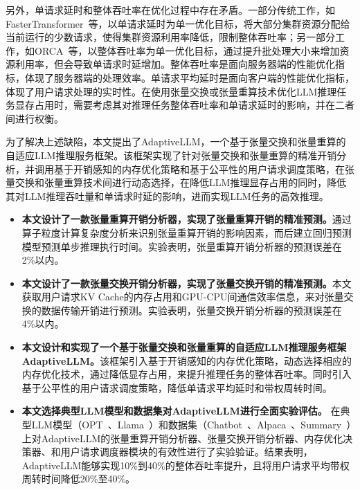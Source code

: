 {\color{red}另外，单请求延时和整体吞吐率在优化过程中存在矛盾。一部分传统工作，如FasterTransformer~\cite{FasterTransformer}等，以单请求延时为单一优化目标，将大部分集群资源分配给当前运行的少数请求，使得集群资源利用率降低，限制整体吞吐率；另一部分工作，如ORCA~\cite{vLLM, ORCA}等，以整体吞吐率为单一优化目标，通过提升批处理大小来增加资源利用率，但会导致单请求时延增加。}整体吞吐率是面向服务器端的性能优化指标，体现了服务器端的处理效率。单请求平均延时是面向客户端的性能优化指标，体现了用户请求处理的实时性。在使用张量交换或张量重算技术优化LLM推理任务显存占用时，需要考虑其对推理任务整体吞吐率和单请求延时的影响，并在二者间进行权衡。

为了解决上述缺陷，本文提出了AdaptiveLLM，一个基于张量交换和张量重算的自适应LLM推理服务框架。该框架实现了针对张量交换和张量重算的精准开销分析，并调用基于开销感知的内存优化策略和基于公平性的用户请求调度策略，在张量交换和张量重算技术间进行动态选择，在降低LLM推理显存占用的同时，降低其对LLM推理吞吐量和单请求时延的影响，进而实现LLM任务的高效推理。

\begin{itemize}

    \item \textbf{本文设计了一款张量重算开销分析器，实现了张量重算开销的精准预测。}通过算子粒度计算复杂度分析来识别张量重算开销的影响因素，而后建立回归预测模型预测单步推理执行时间。实验表明，张量重算开销分析器的预测误差在2\%以内。
    
    \item \textbf{本文设计了一款张量交换开销分析器，实现了张量交换开销的精准预测。}本文获取用户请求KV Cache的内存占用和GPU-CPU间通信效率信息，来对张量交换的数据传输开销进行预测。实验表明，张量交换开销分析器的预测误差在4\%以内。

    \item \textbf{本文设计和实现了一个基于张量交换和张量重算的自适应LLM推理服务框架AdaptiveLLM。}该框架引入基于开销感知的内存优化策略，动态选择相应的内存优化技术，通过降低显存占用，来提升推理任务的整体吞吐率。同时引入基于公平性的用户请求调度策略，降低单请求平均延时和带权周转时间。
    
    \item \textbf{本文选择典型LLM模型和数据集对AdaptiveLLM进行全面实验评估。} 在典型LLM模型（OPT~\cite{OPT}、Llama~\cite{Llama}）和数据集（Chatbot~\cite{Chatbot}、Alpaca~\cite{Alpaca}、Summary~\cite{Summary}）上对AdaptiveLLM的张量重算开销分析器、张量交换开销分析器、内存优化决策器、和用户请求调度器模块的有效性进行了实验验证。结果表明，AdaptiveLLM能够实现10\%到40\%的整体吞吐率提升，且将用户请求平均带权周转时间降低20\%至40\%。

\end{itemize}